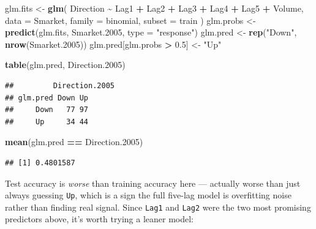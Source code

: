 \documentclass[
  11pt,
]{article}
\newenvironment{Shaded}{\begin{snugshade}}{\end{snugshade}}
\newcommand{\AttributeTok}[1]{\textcolor[rgb]{0.13,0.29,0.53}{#1}}
\newcommand{\FloatTok}[1]{\textcolor[rgb]{0.00,0.00,0.81}{#1}}
\newcommand{\FunctionTok}[1]{\textcolor[rgb]{0.13,0.29,0.53}{\textbf{#1}}}
\newcommand{\NormalTok}[1]{#1}
\newcommand{\OtherTok}[1]{\textcolor[rgb]{0.56,0.35,0.01}{#1}}
\newcommand{\SpecialCharTok}[1]{\textcolor[rgb]{0.81,0.36,0.00}{\textbf{#1}}}
\newcommand{\StringTok}[1]{\textcolor[rgb]{0.31,0.60,0.02}{#1}}
\begin{document}
\begin{Shaded}
\begin{Highlighting}[]
\NormalTok{glm.fits }\OtherTok{\textless{}{-}} \FunctionTok{glm}\NormalTok{(}
\NormalTok{  Direction }\SpecialCharTok{\textasciitilde{}}\NormalTok{ Lag1 }\SpecialCharTok{+}\NormalTok{ Lag2 }\SpecialCharTok{+}\NormalTok{ Lag3 }\SpecialCharTok{+}\NormalTok{ Lag4 }\SpecialCharTok{+}\NormalTok{ Lag5 }\SpecialCharTok{+}\NormalTok{ Volume,}
  \AttributeTok{data =}\NormalTok{ Smarket, }\AttributeTok{family =}\NormalTok{ binomial, }\AttributeTok{subset =}\NormalTok{ train}
\NormalTok{)}
\NormalTok{glm.probs }\OtherTok{\textless{}{-}} \FunctionTok{predict}\NormalTok{(glm.fits, Smarket}\FloatTok{.2005}\NormalTok{, }\AttributeTok{type =} \StringTok{"response"}\NormalTok{)}
\NormalTok{glm.pred }\OtherTok{\textless{}{-}} \FunctionTok{rep}\NormalTok{(}\StringTok{"Down"}\NormalTok{, }\FunctionTok{nrow}\NormalTok{(Smarket}\FloatTok{.2005}\NormalTok{))}
\NormalTok{glm.pred[glm.probs }\SpecialCharTok{\textgreater{}} \FloatTok{0.5}\NormalTok{] }\OtherTok{\textless{}{-}} \StringTok{"Up"}

\FunctionTok{table}\NormalTok{(glm.pred, Direction}\FloatTok{.2005}\NormalTok{)}
\end{Highlighting}
\end{Shaded}

\begin{verbatim}
##         Direction.2005
## glm.pred Down Up
##     Down   77 97
##     Up     34 44
\end{verbatim}

\begin{Shaded}
\begin{Highlighting}[]
\FunctionTok{mean}\NormalTok{(glm.pred }\SpecialCharTok{==}\NormalTok{ Direction}\FloatTok{.2005}\NormalTok{)}
\end{Highlighting}
\end{Shaded}

\begin{verbatim}
## [1] 0.4801587
\end{verbatim}

Test accuracy is \emph{worse} than training accuracy here --- actually
worse than just always guessing \texttt{Up}, which is a sign the full
five-lag model is overfitting noise rather than finding real signal.
Since \texttt{Lag1} and \texttt{Lag2} were the two most promising
predictors above, it's worth trying a leaner model:
\end{document}

